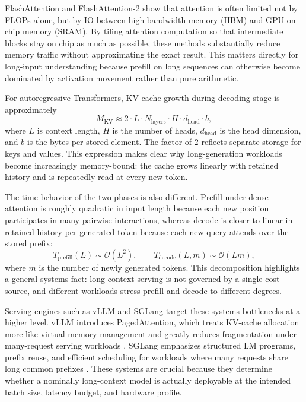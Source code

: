 \documentclass[11pt]{article}
\begin{document}
FlashAttention and FlashAttention-2 show that attention is often limited not by FLOPs alone, but by IO between high-bandwidth memory (HBM) and GPU on-chip memory (SRAM)\citep{dao2022flashattention, dao2023flashattention2}. By tiling attention computation so that intermediate blocks stay on chip as much as possible, these methods substantially reduce memory traffic without approximating the exact result. This matters directly for long-input understanding because prefill on long sequences can otherwise become dominated by activation movement rather than pure arithmetic.

For autoregressive Transformers, KV-cache growth during decoding stage is approximately
\begin{equation}
M_{\mathrm{KV}} \approx 2 \cdot L \cdot N_{\mathrm{layers}} \cdot H \cdot d_{\mathrm{head}} \cdot b,
\end{equation}
where $L$ is context length, $H$ is the number of heads, $d_{\mathrm{head}}$ is the head dimension, and $b$ is the bytes per stored element. The factor of $2$ reflects separate storage for keys and values. This expression makes clear why long-generation workloads become increasingly  memory-bound: the cache grows linearly with retained history and is repeatedly read at every new token.

The time behavior of the two phases is also different. Prefill under dense attention is roughly quadratic in input length because each new position participates in many pairwise interactions, whereas decode is closer to linear in retained history per generated token because each new query attends over the stored prefix:
\begin{equation}
T_{\mathrm{prefill}}(L) \sim \mathcal{O}(L^2), \qquad
T_{\mathrm{decode}}(L, m) \sim \mathcal{O}(Lm),
\end{equation}
where $m$ is the number of newly generated tokens. This decomposition highlights a general systems fact: long-context serving is not governed by a single cost source, and different workloads stress prefill and decode to different degrees.

Serving engines such as vLLM and SGLang target these systems bottlenecks at a higher level. vLLM introduces PagedAttention, which treats KV-cache allocation more like virtual memory management and greatly reduces fragmentation under many-request serving workloads \citep{kwon2023pagedattention}. SGLang emphasizes structured LM programs, prefix reuse, and efficient scheduling for workloads where many requests share long common prefixes \citep{zheng2024sglang}. These systems are crucial because they determine whether a nominally long-context model is actually deployable at the intended batch size, latency budget, and hardware profile.
\end{document}
